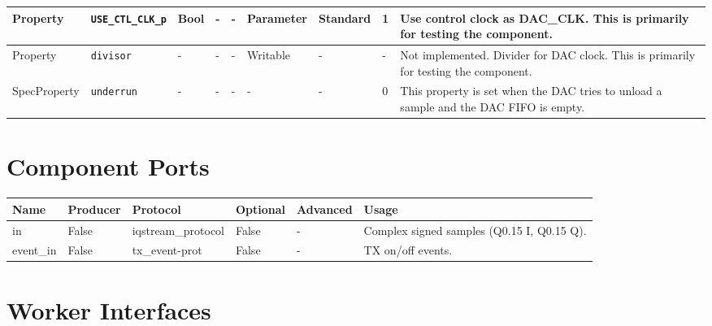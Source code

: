 \documentclass{article}
\begin{document}
\begin{landscape}
\begin{scriptsize}
\begin{tabular}{|p{2cm}|p{4cm}|p{1cm}|p{2cm}|p{2cm}|p{2cm}|p{2cm}|p{1cm}|p{3.95cm}|}
			\hline
			Property     & \verb+USE_CTL_CLK_p+ & Bool & -              & -               & Parameter     & Standard    & 1       & Use control clock as DAC\_CLK. This is primarily for testing the component.                                            \\
			\hline
			Property     & \verb+divisor+       & -    & -              & -               & Writable      & -           & -       & Not implemented. Divider for DAC clock. This is primarily for testing the component.                                   \\
			\hline
			SpecProperty & \verb+underrun+      & -    & -              & -               & -             & -           & 0       & This property is set when the DAC tries to unload a sample and the DAC FIFO is empty.                                  \\
			\hline
		\end{tabular}
	\end{scriptsize}

	\section*{Component Ports}
	\begin{scriptsize}
		\begin{tabular}{|p{2cm}|p{1.5cm}|p{4cm}|p{1.5cm}|p{1.5cm}|p{10.75cm}|}
			\hline
			\rowcolor{blue}
			Name & Producer & Protocol           & Optional & Advanced & Usage                  \\
			\hline
			in   & False    & iqstream\_protocol & False     & -        & Complex signed samples (Q0.15 I, Q0.15 Q). \\
			\hline
			event\_in & False & tx\_event-prot   & False     & -        & TX on/off events. \\
			\hline
		\end{tabular}
	\end{scriptsize}

	\section*{Worker Interfaces}

\end{landscape}
\end{document}
